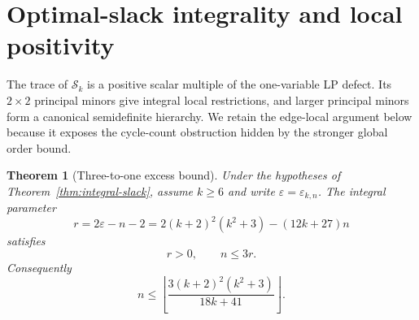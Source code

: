 \documentclass[a4paper,10pt,reqno]{amsart}
\theoremstyle{plain}
\newtheorem{theorem}{Theorem}[section]
\theoremstyle{definition}
\theoremstyle{remark}
\newcommand{\resultbox}[1]{\boxed{#1}}
\begin{document}
\section{Optimal-slack integrality and local positivity}
\label{sec:degree-six}

The trace of \(\mathcal S_k\) is a positive scalar multiple of the
one-variable LP defect.  Its
\(2\times2\) principal minors give integral local restrictions, and larger
principal minors form a canonical semidefinite hierarchy.  We retain the
edge-local argument below because it exposes the cycle-count obstruction
hidden by the stronger global order bound.

\begin{theorem}[Three-to-one excess bound]\label{thm:three-to-one}
Under the hypotheses of Theorem~\ref{thm:integral-slack}, assume \(k\ge6\)
and write \(\varepsilon=\varepsilon_{k,n}\).  The integral parameter
\[
 r=2\varepsilon-n-2
   =2(k+2)^2(k^2+3)-(12k+27)n
\]
satisfies
\[
 r>0,\qquad n\le3r.
\]
Consequently
\[
 \resultbox{
 n\le\left\lfloor
 \frac{3(k+2)^2(k^2+3)}{18k+41}
 \right\rfloor.
 }
\]
\end{theorem}
\end{document}
